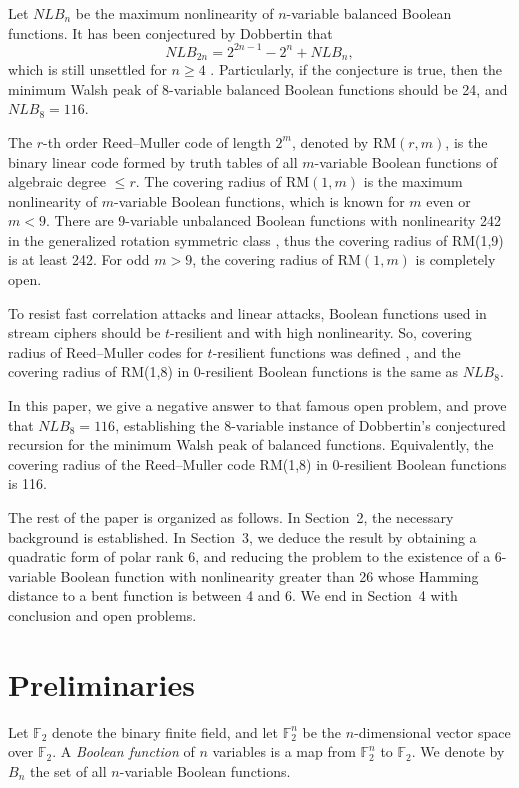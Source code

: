 \documentclass[11pt]{article}
\newtheorem{open problem}{Open problem}
\begin{document}
Let $NLB_n$ be the maximum nonlinearity of $n$-variable balanced Boolean functions.  It has been conjectured by Dobbertin \cite{Dobbertin} that
\[
NLB_{2n}=2^{2n-1}-2^n+NLB_n,
 \]
 which is still unsettled for $n\ge 4$ \cite{Oz}. Particularly, if the conjecture  is true, then the minimum Walsh peak of 8-variable balanced Boolean functions should be 24, and $NLB_8=116$.


 The $r$-th order Reed--Muller code of length $2^m$, denoted by RM$(r,m)$, is the binary linear code formed
by truth tables of all $m$-variable Boolean functions of algebraic degree $\leq r$.  The covering radius of RM$(1,m)$ is the maximum nonlinearity of $m$-variable Boolean functions, which is known for $m$ even or $m<9$. There are 9-variable unbalanced Boolean functions with nonlinearity 242 in the generalized rotation symmetric class \cite{Kavut,Kavut2}, thus the covering radius of RM(1,9) is at least 242. For odd $m>9$,  the covering radius of RM$(1,m)$ is completely open.

 To resist fast correlation attacks and linear attacks, Boolean functions used in stream ciphers should be $t$-resilient and with high nonlinearity. So, covering radius of Reed--Muller codes
for $t$-resilient functions was defined \cite{Borissov,Iwata}, and the covering radius of RM(1,8) in 0-resilient Boolean functions is the same as $NLB_8$.

In this paper, we give a negative answer to that famous open problem, and  prove that $NLB_8=116$, establishing the 8-variable instance of Dobbertin's conjectured recursion for the minimum Walsh peak of balanced functions. Equivalently, the covering radius of the Reed--Muller code RM(1,8) in 0-resilient Boolean functions is 116.

 The rest of the paper is organized as follows. In Section~2, the necessary background is established. In Section~3, we deduce the result by obtaining a quadratic form of polar rank 6, and reducing the problem to the existence of a 6-variable Boolean function with nonlinearity greater than 26 whose Hamming distance to a bent function is between 4 and 6. We end in Section~4 with conclusion and open problems.

\section{Preliminaries}
Let $\mathbb{F}_{2}$ denote the binary finite field, and let $\mathbb{F}_{2}^{n}$ be the $n$-dimensional vector space over $\mathbb{F}_{2}$. A {\em Boolean function} of $n$ variables is a map from $\mathbb{F}_{2}^{n}$ to $\mathbb{F}_{2}$. We denote by $B_{n}$ the set
of all $n$-variable Boolean functions.
\end{document}
